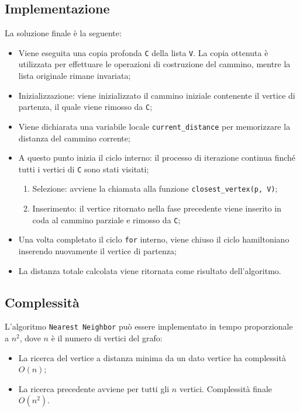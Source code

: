 \subsection{Implementazione}
 La soluzione finale è la seguente:
\begin{itemize}
	\item Viene eseguita una copia profonda \texttt{C} della lista \texttt{V}. La copia ottenuta è utilizzata per effettuare le operazioni di costruzione del cammino, mentre la lista originale rimane invariata;
	\item Inizializzazione: viene inizializzato il cammino iniziale contenente il vertice di partenza, il quale viene rimosso da \texttt{C};
	\item Viene dichiarata una variabile locale \texttt{current\_distance} per memorizzare la distanza del cammino corrente;
	\item A questo punto inizia il ciclo interno: il processo di iterazione continua finché tutti i vertici di \texttt{C} sono stati visitati;
	\begin{enumerate}
		\item Selezione: avviene la chiamata alla funzione \texttt{closest\_vertex(p, V)};
		\item Inserimento: il vertice ritornato nella fase precedente viene inserito in coda al cammino parziale e rimosso da \texttt{C};
	\end{enumerate}  
	\item Una volta completato il ciclo \texttt{for} interno, viene chiuso il ciclo hamiltoniano inserendo nuovamente il vertice di partenza;
	\item La distanza totale calcolata viene ritornata come risultato dell'algoritmo.
\end{itemize}

\subsection{Complessità}
L'algoritmo \texttt{Nearest Neighbor} può essere implementato in tempo proporzionale a $n^2$, dove $n$ è il numero di vertici del grafo:
\begin{itemize}
	\item La ricerca del vertice a distanza minima da un dato vertice ha complessità $O(n)$;
	\item La ricerca precedente avviene per tutti gli $n$ vertici. Complessità finale $O(n^2)$.
\end{itemize}
\pagebreak